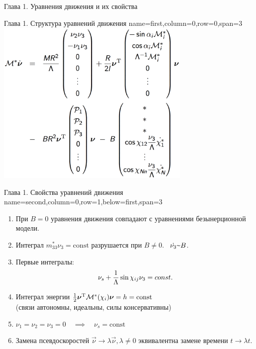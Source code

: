 \begin{myposter}{
    Глава 1. Уравнения движения и их свойства 
}

    \headerbox
    {Глава 1. Структура уравнений движения}
    {name=first,column=0,row=0,span=3}
    {
        {\huge\bf
            \vspace{10pt}
            \centering
            \includegraphics[width=0.7\textwidth]{content/pic/asypng/eq_struct.png}
            \vspace{10pt}
        }
    }
    
    \headerbox
    {Глава 1. Свойства уравнений движения}
    {name=second,column=0,row=1,below=first,span=3}
    {
        {\huge\bf
            \vspace{10pt}
            \begin{enumerate}
                \item При $B = 0$ уравнения движения совпадают с уравнениями безынерционной модели.
                \item Интеграл $m_{33}^*\nu_3 = \mathrm{const}$ разрушается при $B \neq 0$. \ $\dot{\nu_3} \textprop B$.
                \item Первые интегралы:
                $$\nu_s + \displaystyle\frac{\displaystyle 1}{\displaystyle \Lambda}\sin\chi_{ij}\nu_3 = const.$$
                \item Интеграл энергии \quad $\frac{1}{2}\boldsymbol{\mathbf{\nu}}^\mathrm{T}\mathcal{M}^*(\chi_i)\boldsymbol{\mathbf{\nu}} = h = \mathrm{const}$\\
                (связи автономны, идеальны, силы консервативны)
                \item $\nu_1 = \nu_2 = \nu_3 = 0 \quad \implies \quad \nu_s = \mathrm{const}$
                \item Замена псевдоскоростей $\vec{\nu} \rightarrow \lambda\vec{\nu}, \lambda \neq 0$ эквивалентна замене времени $t \rightarrow \lambda t$.
            \end{enumerate}
            \vspace{10pt}
        }
    }

\end{myposter}
